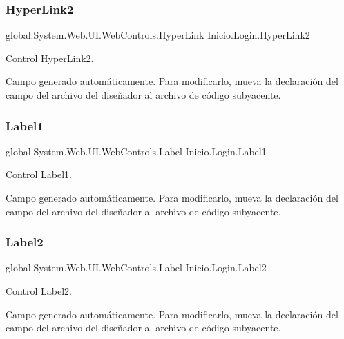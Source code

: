 \subsubsection{\texorpdfstring{HyperLink2}{HyperLink2}}
{\footnotesize\ttfamily global.\+System.\+Web.\+U\+I.\+Web\+Controls.\+Hyper\+Link Inicio.\+Login.\+Hyper\+Link2\hspace{0.3cm}{\ttfamily [protected]}}



Control Hyper\+Link2. 

Campo generado automáticamente. Para modificarlo, mueva la declaración del campo del archivo del diseñador al archivo de código subyacente. \mbox{\label{class_inicio_1_1_login_a089c50220a66bcedf279557e235b7fb1}} 
\subsubsection{\texorpdfstring{Label1}{Label1}}
{\footnotesize\ttfamily global.\+System.\+Web.\+U\+I.\+Web\+Controls.\+Label Inicio.\+Login.\+Label1\hspace{0.3cm}{\ttfamily [protected]}}



Control Label1. 

Campo generado automáticamente. Para modificarlo, mueva la declaración del campo del archivo del diseñador al archivo de código subyacente. \mbox{\label{class_inicio_1_1_login_a88ab7f12f1587cb3a0174d4bdc7baa39}} 
\subsubsection{\texorpdfstring{Label2}{Label2}}
{\footnotesize\ttfamily global.\+System.\+Web.\+U\+I.\+Web\+Controls.\+Label Inicio.\+Login.\+Label2\hspace{0.3cm}{\ttfamily [protected]}}



Control Label2. 

Campo generado automáticamente. Para modificarlo, mueva la declaración del campo del archivo del diseñador al archivo de código subyacente. \mbox{\label{class_inicio_1_1_login_ad052535d49bad44248dd771596f4a8af}} 
